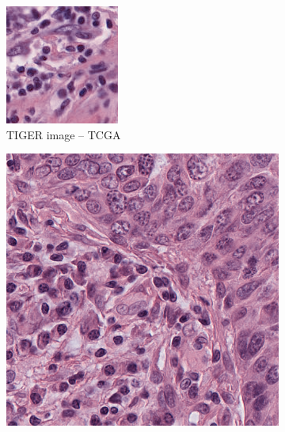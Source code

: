 \begin{figure}[H]
  \par\vspace{1em} %

  \begin{subfigure}[b]{0.32\textwidth}
    \centering
    \includegraphics[width=\linewidth]{assets/images/for_presentation/norm_TCGA-EW-A1P8-01Z-00-DX1.E9852193-8CDD-49EF-B49B-DA6931198F0D_[8391, 13690, 8532, 13838].png}
    \caption{TIGER image – TCGA}
    \label{fig:tiger-tcga}
  \end{subfigure}\quad
  \begin{subfigure}[b]{0.32\textwidth}
    \centering
    \includegraphics[width=\linewidth]{assets/images/for_presentation/norm_10_1.png}

\end{subfigure}
\end{figure}
